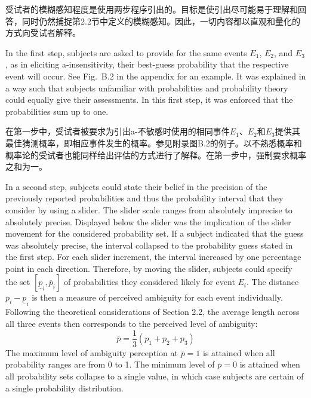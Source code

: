 \documentclass[12pt,a4paper]{article}
\newenvironment{original}
  {\par\medskip\noindent\color{black}\ignorespaces}
  {\par\medskip}
\newenvironment{translation}
  {\par\noindent\color{transblue}\ignorespaces}
  {\par\medskip\medskip}
\begin{document}
\begin{translation}
受试者的模糊感知程度是使用两步程序引出的。目标是使引出尽可能易于理解和回答，同时仍然捕捉第2.2节中定义的模糊感知。因此，一切内容都以直观和量化的方式向受试者解释。
\end{translation}

\begin{original}
In the first step, subjects are asked to provide for the same events $E_1$, $E_2$, and $E_3$, as in eliciting a-insensitivity, their best-guess probability that the respective event will occur. See Fig.\ B.2 in the appendix for an example. It was explained in a way such that subjects unfamiliar with probabilities and probability theory could equally give their assessments. In this first step, it was enforced that the probabilities sum up to one.
\end{original}

\begin{translation}
在第一步中，受试者被要求为引出a-不敏感时使用的相同事件$E_1$、$E_2$和$E_3$提供其最佳猜测概率，即相应事件发生的概率。参见附录图B.2的例子。以不熟悉概率和概率论的受试者也能同样给出评估的方式进行了解释。在第一步中，强制要求概率之和为一。
\end{translation}

\begin{original}
In a second step, subjects could state their belief in the precision of the previously reported probabilities and thus the probability interval that they consider by using a slider. The slider scale ranges from absolutely imprecise to absolutely precise. Displayed below the slider was the implication of the slider movement for the considered probability set. If a subject indicated that the guess was absolutely precise, the interval collapsed to the probability guess stated in the first step. For each slider increment, the interval increased by one percentage point in each direction. Therefore, by moving the slider, subjects could specify the set $[\underline{p}_i, \overline{p}_i]$ of probabilities they considered likely for event $E_i$. The distance $\overline{p}_i - \underline{p}_i$ is then a measure of perceived ambiguity for each event individually. Following the theoretical considerations of Section 2.2, the average length across all three events then corresponds to the perceived level of ambiguity:
\begin{equation}
\bar{p} = \frac{1}{3} (p_1 + p_2 + p_3) \label{eq:8}
\end{equation}
The maximum level of ambiguity perception at $\bar{p} = 1$ is attained when all probability ranges are from 0 to 1. The minimum level of $\bar{p} = 0$ is attained when all probability sets collapse to a single value, in which case subjects are certain of a single probability distribution.
\end{original}
\end{document}
